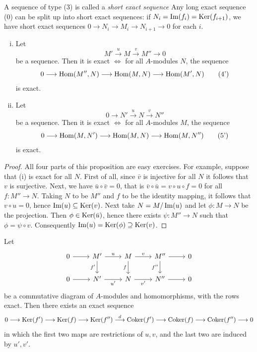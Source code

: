 A sequence of type (3) is called a \emph{short exact sequence} Any long exact sequence (0) can be split up into short exact sequences: if $N_i = \operatorname{Im}(f_i) = \operatorname{Ker}(f_{i+1})$, we have short exact sequences $0 \longrightarrow N_i \longrightarrow M_i \longrightarrow N_{i+1} \longrightarrow 0$ for each $i$.

\begin{proposition}\label{prop:exact-hom}
\begin{enumerate}[i)]
    \item Let \[M' \stackrel{u}{\longrightarrow} M \stackrel{v}{\longrightarrow} M'' \longrightarrow 0 \tag{4}\] be a sequence. Then it is exact $\iff$ for all $A$-modules $N$, the sequence
    \[
        0 \longrightarrow \operatorname{Hom}(M'', N) \longrightarrow \operatorname{Hom}(M, N) \longrightarrow \operatorname{Hom}(M', N) \tag{4'}
    \]
    is exact.
    \item Let \[0 \longrightarrow N' \stackrel{u}{\longrightarrow} N \stackrel{v}{\longrightarrow} N''\tag{5}\] be a sequence. Then it is exact $\iff$ for all $A$-modules $M$, the sequence
    \[
        0 \longrightarrow \operatorname{Hom}(M, N') \longrightarrow \operatorname{Hom}(M, N) \longrightarrow \operatorname{Hom}(M, N'')\tag{5'}
    \]
    is exact.
\end{enumerate}
\end{proposition}

\begin{proof}
All four parts of this proposition are easy exercises. For example, suppose that (i) is exact for all $N$. First of all, since $\bar{v}$ is injective for all $N$ it follows that $v$ is surjective. Next, we have $\bar{u} \circ \bar{v} = 0$, that is $\bar{v} \circ \bar{u} = v \circ u \circ f = 0$ for all $f \colon M'' \to N$. Taking $N$ to be $M''$ and $f$ to be the identity mapping, it follows that $v \circ u = 0$, hence $\operatorname{Im}(u) \subseteq \operatorname{Ker}(v)$. Next take $N = M/\operatorname{Im}(u)$ and let $\phi \colon M \to N$ be the projection. Then $\phi \in \operatorname{Ker}(\bar{u})$, hence there exists $\psi \colon M'' \to N$ such that $\phi = \psi \circ v$. Consequently $\operatorname{Im}(u) = \operatorname{Ker}(\phi) \supseteq \operatorname{Ker}(v)$.
\end{proof}

\begin{proposition}\label{prop:snake-lemma}
Let
\[\begin{tikzcd}
	0 & {M'} & M & {M''} & 0 \\
	0 & {N'} & N & {N''} & 0
	\arrow[from=1-1, to=1-2]
	\arrow["u", from=1-2, to=1-3]
	\arrow["{f'}"', from=1-2, to=2-2]
	\arrow["v", from=1-3, to=1-4]
	\arrow["f"', from=1-3, to=2-3]
	\arrow[from=1-4, to=1-5]
	\arrow["{f''}"', from=1-4, to=2-4]
	\arrow[from=2-1, to=2-2]
	\arrow["{u'}"', from=2-2, to=2-3]
	\arrow["{v'}"', from=2-3, to=2-4]
	\arrow[from=2-4, to=2-5]
\end{tikzcd}\]
be a commutative diagram of $A$-modules and homomorphisms, with the rows exact. Then there exists an exact sequence
\[
    0 \longrightarrow \operatorname{Ker}(f') \longrightarrow \operatorname{Ker}(f) \longrightarrow \operatorname{Ker}(f'') \stackrel{d}{\longrightarrow} \operatorname{Coker}(f') \longrightarrow \operatorname{Coker}(f) \longrightarrow \operatorname{Coker}(f'') \longrightarrow 0
\]
in which the first two maps are restrictions of $u, v$, and the last two are induced by $u', v'$.
\end{proposition}

